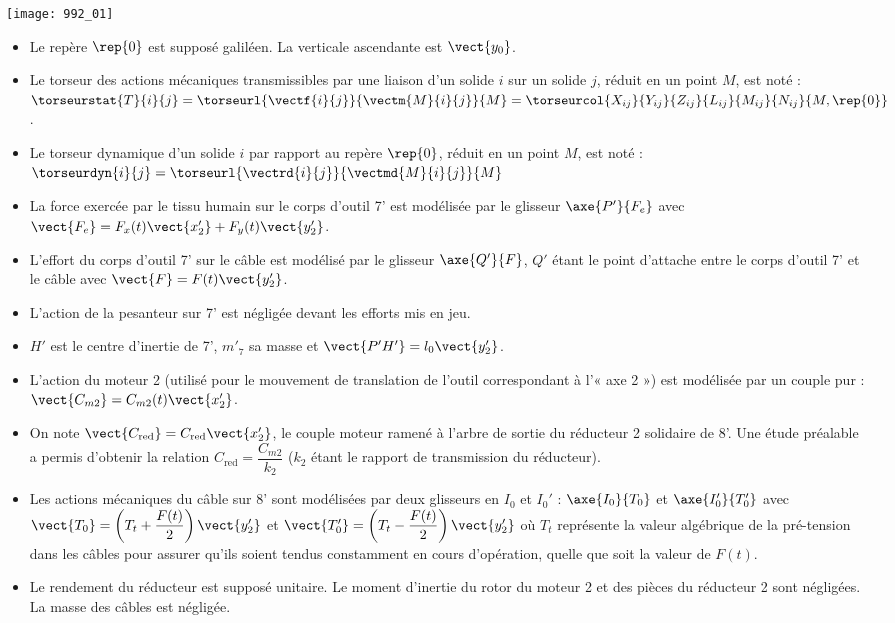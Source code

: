 \begin{center}
\texttt{[image: 992\_01]}
\end{center}

\begin{itemize}
\item Le repère $\rep{0}$ est supposé galiléen. La verticale ascendante est $\vect{y_0}$.
\item Le torseur des actions mécaniques transmissibles par une liaison d’un solide $i$ sur un solide $j$, réduit en un
point $M$, est noté : $\torseurstat{T}{i}{j}=\torseurl{\vectf{i}{j}}{\vectm{M}{i}{j}}{M} = \torseurcol{X_{ij}}{Y_{ij}}{Z_{ij}}{L_{ij}}{M_{ij}}{N_{ij}}{M,\rep{0}}$.
\item Le torseur dynamique d’un solide $i$ par rapport au repère $\rep{0}$, réduit en un point $M$, est noté : 
 $\torseurdyn{i}{j}=\torseurl{\vectrd{i}{j}}{\vectmd{M}{i}{j}}{M}$
\item La force exercée par le tissu humain sur le corps d’outil 7’ est modélisée par le glisseur $\axe{P'}{F_e}$
avec $\vect{F_e}=F_x(t)\vect{x_2'}+F_y(t)\vect{y_2'}$.
\item L’effort du corps d’outil 7’ sur le câble est modélisé par le glisseur $\axe{Q'}{F}$, $Q'$ étant le point
d’attache entre le corps d’outil 7’ et le câble avec $\vect{F}=F(t)\vect{y_2'}$.
\item L’action de la pesanteur sur 7’ est négligée devant les efforts mis en jeu.
\item $H'$ est le centre d’inertie de 7’, $m'_7$ sa masse et $\vect{P'H'}=l_0\vect{y_2'}$.
\item L’action du moteur 2 (utilisé pour le mouvement de translation de l’outil correspondant à l’« axe 2 ») est
modélisée par un couple pur : $\vect{C_{m2}}=C_{m2}(t)\vect{x_2'}$.
\item On note  $\vect{C_{\text{red}}}=C_{\text{red}}\vect{x_2'}$, le couple moteur ramené à l’arbre de sortie du réducteur 2 solidaire de 8’. Une étude préalable a permis d’obtenir la relation
$C_{\text{red}}=\dfrac{C_{m2}}{k_2}$ ($k_2$ étant le rapport de transmission du réducteur).
\item Les actions mécaniques du câble sur 8’ sont modélisées par deux glisseurs en $I_0$ et $I_0'$ : 
$\axe{I_0}{T_0}$  et $\axe{I_0'}{T_0'}$ avec
$\vect{T_0}=\left( T_t + \dfrac{F(t)}{2}\right)\vect{y_2'}$
et $\vect{T'_0}=\left( T_t - \dfrac{F(t)}{2}\right)\vect{y_2'}$ où
$T_t$ représente la valeur algébrique de la pré-tension dans les câbles pour assurer qu’ils soient tendus constamment en cours d’opération, quelle que soit la valeur de $F(t)$.
\item Le rendement du réducteur est supposé unitaire. Le moment d’inertie du rotor du moteur 2 et des pièces du réducteur 2 sont négligées. La masse des câbles est négligée.
\end{itemize}
